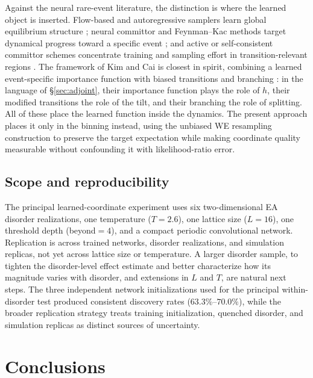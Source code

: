 \documentclass[a4paper,fleqn]{cas-sc}
\begin{document}
Against the neural rare-event literature, the distinction is where the learned object is
inserted. Flow-based and autoregressive samplers learn global equilibrium structure
\citep{wu2019,noe2019,nicoli2020,gabrie2022}; neural committor and Feynman--Kac methods target
dynamical progress toward a specific event \citep{khoo2019,li2022,strahan2023}; and active or
self-consistent committor schemes concentrate training and sampling effort in
transition-relevant regions \citep{rotskoff2022,kang2024,trizio2025}. The framework of Kim and
Cai is closest in spirit, combining a learned event-specific importance function with biased
transitions and branching \citep{kimcai2026}: in the language of \S\ref{sec:adjoint}, their
importance function plays the role of $h$, their modified transitions the role of the tilt, and
their branching the role of splitting. All of these place the learned function inside the
dynamics. The present approach places it only in the binning instead, using the unbiased WE resampling
construction to preserve the target expectation while making coordinate quality measurable
without confounding it with likelihood-ratio error.

\subsection{Scope and reproducibility}\label{sec:scope}
The principal learned-coordinate experiment uses six two-dimensional EA disorder
realizations, one temperature ($T=2.6$), one lattice size ($L=16$), one threshold depth
(beyond$=4$), and a compact periodic convolutional network. Replication is across trained
networks, disorder realizations, and simulation replicas, not yet across lattice size or
temperature. A larger disorder sample, to tighten the disorder-level effect estimate and better
characterize how its magnitude varies with disorder, and extensions in $L$ and $T$, are natural
next steps. The three independent network initializations used for the principal within-disorder
test produced consistent discovery rates ($63.3\%$--$70.0\%$), while the broader replication
strategy treats training initialization, quenched disorder, and simulation replicas as distinct
sources of uncertainty.

\FloatBarrier

\section{Conclusions}\label{sec:conclusions}
\end{document}
